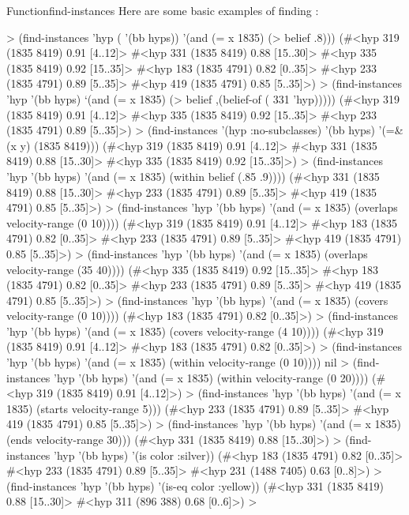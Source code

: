 \documentclass[10pt,twoside,english,pdftex]{article}
\begin{document}
\begin{functiondoc}{Function}{find-instances}
\fnexamples
{}%
%
%
Here are some basic examples of finding  :
%
\W\supp
\begin{example}
  > (find-instances 'hyp ( '(bb hyps)) 
      '(and (= x 1835) (> belief .8)))
  (#<hyp 319 (1835 8419) 0.91 [4..12]>
   #<hyp 331 (1835 8419) 0.88 [15..30]>
   #<hyp 335 (1835 8419) 0.92 [15..35]>
   #<hyp 183 (1835 4791) 0.82 [0..35]>
   #<hyp 233 (1835 4791) 0.89 [5..35]>
   #<hyp 419 (1835 4791) 0.85 [5..35]>)\goodpagebreak
  > (find-instances 'hyp '(bb hyps)
      `(and (= x 1835) 
            (> belief ,(belief-of ( 331 'hyp)))))
  (#<hyp 319 (1835 8419) 0.91 [4..12]>
   #<hyp 335 (1835 8419) 0.92 [15..35]>
   #<hyp 233 (1835 4791) 0.89 [5..35]>)\goodpagebreak
  > (find-instances '(hyp :no-subclasses) '(bb hyps)
      '(=\& (x y) (1835 8419)))
  (#<hyp 319 (1835 8419) 0.91 [4..12]>
   #<hyp 331 (1835 8419) 0.88 [15..30]>
   #<hyp 335 (1835 8419) 0.92 [15..35]>)\goodpagebreak
  > (find-instances 'hyp '(bb hyps) 
      '(and (= x 1835) (within belief (.85 .9))))
  (#<hyp 331 (1835 8419) 0.88 [15..30]>
   #<hyp 233 (1835 4791) 0.89 [5..35]>
   #<hyp 419 (1835 4791) 0.85 [5..35]>)\goodpagebreak
  > (find-instances 'hyp '(bb hyps) 
      '(and (= x 1835) (overlaps velocity-range (0 10))))
  (#<hyp 319 (1835 8419) 0.91 [4..12]>
   #<hyp 183 (1835 4791) 0.82 [0..35]>
   #<hyp 233 (1835 4791) 0.89 [5..35]>
   #<hyp 419 (1835 4791) 0.85 [5..35]>)\goodpagebreak
  > (find-instances 'hyp '(bb hyps) 
      '(and (= x 1835) (overlaps velocity-range (35 40))))
  (#<hyp 335 (1835 8419) 0.92 [15..35]>
   #<hyp 183 (1835 4791) 0.82 [0..35]>
   #<hyp 233 (1835 4791) 0.89 [5..35]>
   #<hyp 419 (1835 4791) 0.85 [5..35]>)\goodpagebreak
  > (find-instances 'hyp '(bb hyps) 
      '(and (= x 1835) (covers velocity-range (0 10))))
  (#<hyp 183 (1835 4791) 0.82 [0..35]>)
  > (find-instances 'hyp '(bb hyps) 
      '(and (= x 1835) (covers velocity-range (4 10))))
  (#<hyp 319 (1835 8419) 0.91 [4..12]>
   #<hyp 183 (1835 4791) 0.82 [0..35]>)\goodpagebreak
  > (find-instances 'hyp '(bb hyps) 
      '(and (= x 1835) (within velocity-range (0 10))))
  nil
  > (find-instances 'hyp '(bb hyps) 
      '(and (= x 1835) (within velocity-range (0 20))))
  (#<hyp 319 (1835 8419) 0.91 [4..12]>)\goodpagebreak
  > (find-instances 'hyp '(bb hyps) 
      '(and (= x 1835) (starts velocity-range 5)))
  (#<hyp 233 (1835 4791) 0.89 [5..35]>
   #<hyp 419 (1835 4791) 0.85 [5..35]>)\goodpagebreak
  > (find-instances 'hyp '(bb hyps) 
      '(and (= x 1835) (ends velocity-range 30)))
  (#<hyp 331 (1835 8419) 0.88 [15..30]>)
  > (find-instances 'hyp '(bb hyps) 
      '(is color :silver))
  (#<hyp 183 (1835 4791) 0.82 [0..35]> 
   #<hyp 233 (1835 4791) 0.89 [5..35]>
   #<hyp 231 (1488 7405) 0.63 [0..8]>)
  > (find-instances 'hyp '(bb hyps) 
      '(is-eq color :yellow))
  (#<hyp 331 (1835 8419) 0.88 [15..30]> 
   #<hyp 311 (896 388) 0.68 [0..6]>)
  >
\end{example}


\end{functiondoc}
\end{document}
